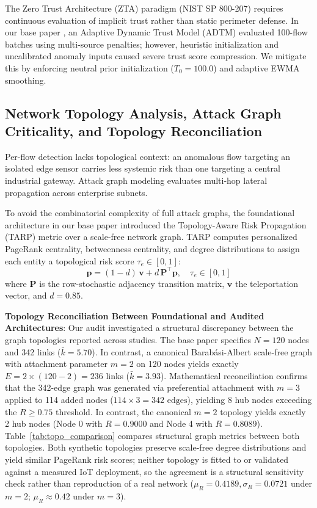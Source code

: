 \documentclass[journal,10pt,onecolumn]{IEEEtran}
\begin{document}
The Zero Trust Architecture (ZTA) paradigm (NIST SP 800-207) requires continuous evaluation of implicit trust rather than static perimeter defense. In our base paper \cite{1}, an Adaptive Dynamic Trust Model (ADTM) evaluated 100-flow batches using multi-source penalties; however, heuristic initialization and uncalibrated anomaly inputs caused severe trust score compression. We mitigate this by enforcing neutral prior initialization ($T_0 = 100.0$) and adaptive EWMA smoothing.

\subsection{Network Topology Analysis, Attack Graph Criticality, and Topology Reconciliation}
Per-flow detection lacks topological context: an anomalous flow targeting an isolated edge sensor carries less systemic risk than one targeting a central industrial gateway. Attack graph modeling evaluates multi-hop lateral propagation across enterprise subnets.

To avoid the combinatorial complexity of full attack graphs, the foundational architecture in our base paper \cite{1} introduced the Topology-Aware Risk Propagation (TARP) metric over a scale-free network graph. TARP computes personalized PageRank centrality, betweenness centrality, and degree distributions to assign each entity a topological risk score $\tau_e \in [0, 1]$:
$$\mathbf{p} = (1-d)\,\mathbf{v} + d\,\mathbf{P}^{\top}\mathbf{p}, \quad \tau_e \in [0,1]$$
where $\mathbf{P}$ is the row-stochastic adjacency transition matrix, $\mathbf{v}$ the teleportation vector, and $d = 0.85$.

\textbf{Topology Reconciliation Between Foundational and Audited Architectures}:
Our audit investigated a structural discrepancy between the graph topologies reported across studies. The base paper \cite{1} specifies $N=120$ nodes and 342 links ($\bar{k} = 5.70$). In contrast, a canonical Barabási-Albert scale-free graph with attachment parameter $m=2$ on 120 nodes yields exactly $E = 2 \times (120 - 2) = 236$ links ($\bar{k} = 3.93$). Mathematical reconciliation confirms that the 342-edge graph was generated via preferential attachment with $m=3$ applied to 114 added nodes ($114 \times 3 = 342\text{ edges}$), yielding 8 hub nodes exceeding the $R \ge 0.75$ threshold. In contrast, the canonical $m=2$ topology yields exactly 2 hub nodes (Node 0 with $R=0.9000$ and Node 4 with $R=0.8089$). Table~\ref{tab:topo_comparison} compares structural graph metrics between both topologies. Both synthetic topologies preserve scale-free degree distributions and yield similar PageRank risk scores; neither topology is fitted to or validated against a measured IoT deployment, so the agreement is a structural sensitivity check rather than reproduction of a real network ($\mu_R = 0.4189, \sigma_R = 0.0721$ under $m=2$; $\mu_R \approx 0.42$ under $m=3$).
\end{document}
